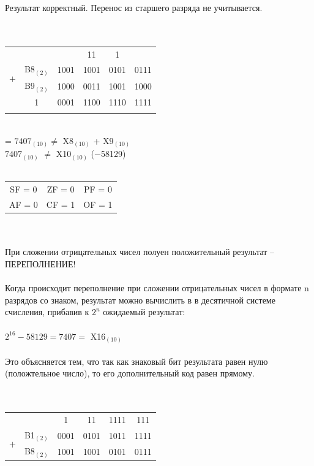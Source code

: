 \documentclass[11pt]{article}
\begin{document}
\begin{paracol}{2}
\begin{enumerate}
		Результат корректный. Перенос из старшего разряда не учитывается.
		\\\\\\
		\begin{tabular}[t]{cccccc}
			&&&\phantom{1}11\phantom{1}&\phantom{11}1\phantom{1}&\\
			\multirow{2}{*}{$+$}  & B8$_{(2)}$ & 1001 & 1001 & 0101 & 0111\\
						            & B9$_{(2)}$ & 1000 & 0011 &  1001 & 1000\\
			\cline{2-6}
						       &   1     & 0001 & 1100 & 1110 & 1111\\
		\\
		\end{tabular}\\
		= $7407_{(10)} \neq$ X8$_{(10)}$ + X9$_{(10)}$\\
		\phantom{=} $7407_{(10)}$ $\neq$ X10$_{(10)}$ ($-$58129)\\\\
		\begin{tabular}{ccc}
			SF = 0 & ZF = 0 & PF = 0 \\
			AF = 0 & CF = 1 & OF = 1\\
		\end{tabular}\\\\
		При сложении отрицательных чисел полуен положительный результат -- ПЕРЕПОЛНЕНИЕ!\\\\
		Когда происходит переполнение при сложении отрицательных чисел в формате n разрядов со знаком, результат можно вычислить в в десятичной системе счисления,
		прибавив к $2^n$ ожидаемый результат:\\\\
		\switchcolumn
		$2^{16} - 58129 = 7407 =$ X16$_{(10)}$\\\\
		Это объясняется тем, что так как знаковый бит результата равен нулю (положтельное число), то его дополнительный код равен прямому.\\\\\\
		\begin{tabular}[t]{cccccc}
			&       &                                                \phantom{11}1\phantom{1}&\phantom{11}11   &1111 &111\phantom{1}\\
			\multirow{2}{*}{$+$} & B1$_{(2)}$ & 0001 & 0101 & 1011 & 1111\\
						          & B8$_{(2)}$ & 1001 & 1001 & 0101 & 0111\\

\end{tabular}
\end{enumerate}
\end{paracol}
\end{document}
